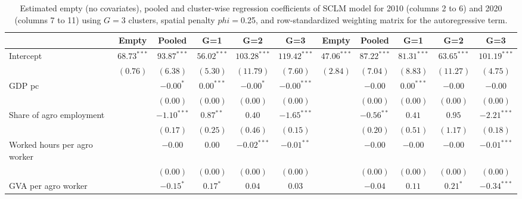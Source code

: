 
\begin{table}
\caption{Estimated empty (no covariates), pooled and cluster-wise regression coefficients of SCLM model for 2010 (columns 2 to 6) and 2020 (columns 7 to 11) using $G=$3 clusters, spatial penalty $phi=$0.25, and row-standardized weighting matrix for the autoregressive term.}
\begin{center}
\begin{tabular}{l c c c c c c c c c c}
\hline
 & Empty & Pooled & G=1 & G=2 & G=3 & Empty & Pooled & G=1 & G=2 & G=3 \\
\hline
Intercept                         & $68.73^{***}$ & $93.87^{***}$ & $56.02^{***}$ & $103.28^{***}$ & $119.42^{***}$ & $47.06^{***}$ & $87.22^{***}$ & $81.31^{***}$ & $63.65^{***}$ & $101.19^{***}$ \\
                                  & $(0.76)$      & $(6.38)$      & $(5.30)$      & $(11.79)$      & $(7.60)$       & $(2.84)$      & $(7.04)$      & $(8.83)$      & $(11.27)$     & $(4.75)$       \\
GDP pc                            &               & $-0.00^{*}$   & $0.00^{***}$  & $-0.00^{*}$    & $-0.00^{***}$  &               & $-0.00$       & $0.00^{***}$  & $-0.00$       & $-0.00$        \\
                                  &               & $(0.00)$      & $(0.00)$      & $(0.00)$       & $(0.00)$       &               & $(0.00)$      & $(0.00)$      & $(0.00)$      & $(0.00)$       \\
Share of agro employment          &               & $-1.10^{***}$ & $0.87^{**}$   & $0.40$         & $-1.65^{***}$  &               & $-0.56^{**}$  & $0.41$        & $0.95$        & $-2.21^{***}$  \\
                                  &               & $(0.17)$      & $(0.25)$      & $(0.46)$       & $(0.15)$       &               & $(0.20)$      & $(0.51)$      & $(1.17)$      & $(0.18)$       \\
Worked hours per agro worker      &               & $-0.00$       & $0.00$        & $-0.02^{***}$  & $-0.01^{**}$   &               & $-0.00$       & $-0.00$       & $-0.00$       & $-0.01^{***}$  \\
                                  &               & $(0.00)$      & $(0.00)$      & $(0.00)$       & $(0.00)$       &               & $(0.00)$      & $(0.00)$      & $(0.00)$      & $(0.00)$       \\
GVA per agro worker               &               & $-0.15^{*}$   & $0.17^{*}$    & $0.04$         & $0.03$         &               & $-0.04$       & $0.11$        & $0.21^{*}$    & $-0.34^{***}$  \\

\end{tabular}
\end{center}
\end{table}
